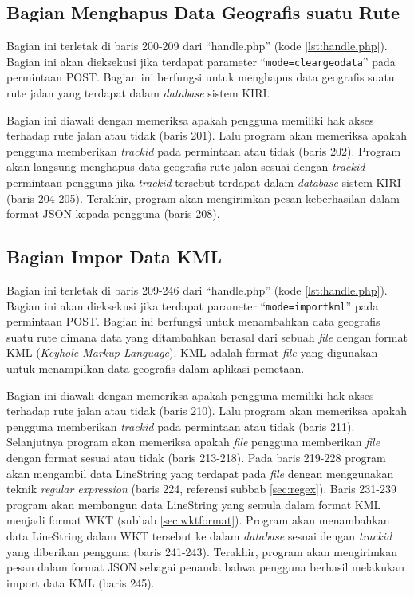 \subsection{Bagian Menghapus Data Geografis suatu Rute}
\label{sec:hapusdatageografis}
Bagian ini terletak di baris 200-209 dari ``handle.php'' (kode \ref{lst:handle.php}). Bagian ini akan dieksekusi jika terdapat parameter ``\texttt{mode=cleargeodata}'' pada permintaan POST. Bagian ini berfungsi untuk menghapus data geografis suatu rute jalan yang terdapat dalam \textit{database} sistem KIRI.

Bagian ini diawali dengan memeriksa apakah pengguna memiliki hak akses terhadap rute jalan atau tidak (baris 201). Lalu program akan memeriksa apakah pengguna memberikan \textit{trackid} pada permintaan atau tidak (baris 202). Program akan langsung menghapus data geografis rute jalan sesuai dengan \textit{trackid} permintaan pengguna jika \textit{trackid} tersebut terdapat dalam \textit{database} sistem KIRI (baris 204-205). Terakhir, program akan mengirimkan pesan keberhasilan dalam format JSON kepada pengguna (baris 208).

\subsection{Bagian Impor Data KML}
\label{sec:imporkml}
Bagian ini terletak di baris 209-246 dari ``handle.php'' (kode \ref{lst:handle.php}). Bagian ini akan dieksekusi jika terdapat parameter ``\texttt{mode=importkml}'' pada permintaan POST. Bagian ini berfungsi untuk menambahkan data geografis suatu rute dimana data yang ditambahkan berasal dari sebuah \textit{file} dengan format KML (\textit{Keyhole Markup Language}). KML adalah format \textit{file} yang digunakan untuk menampilkan data geografis dalam aplikasi pemetaan\cite{kml}. 

Bagian ini diawali dengan memeriksa apakah pengguna memiliki hak akses terhadap rute jalan atau tidak (baris 210). Lalu program akan memeriksa apakah pengguna memberikan \textit{trackid} pada permintaan atau tidak (baris 211). Selanjutnya program akan memeriksa apakah \textit{file} pengguna memberikan \textit{file} dengan format sesuai atau tidak (baris 213-218). Pada baris 219-228 program akan mengambil data LineString yang terdapat pada \textit{file} dengan menggunakan teknik \textit{regular expression} (baris 224, referensi subbab \ref{sec:regex}). Baris 231-239 program akan membangun data LineString yang semula dalam format KML menjadi format WKT (subbab \ref{sec:wktformat}). Program akan menambahkan data LineString dalam WKT tersebut ke dalam \textit{database} sesuai dengan \textit{trackid} yang diberikan pengguna (baris 241-243). Terakhir, program akan mengirimkan pesan dalam format JSON sebagai penanda bahwa pengguna berhasil melakukan import data KML (baris 245).


